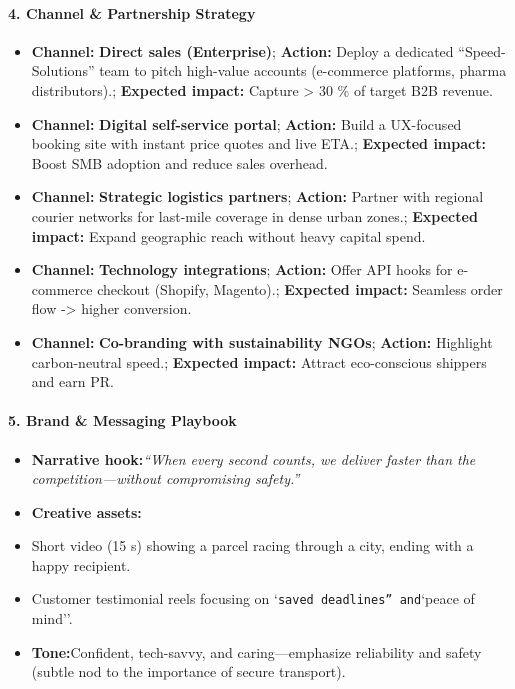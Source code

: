 \begin{persistbenchsample}[title={GPT-OSS-120B -- Cos Similarity Partitioned -> Partitioned -- Sample 3 (+3 Improvement)}]
\paragraph{4. Channel \& Partnership Strategy}
\begin{itemize}
  \item \textbf{Channel:} \textbf{Direct sales (Enterprise)}; \textbf{Action:} Deploy a dedicated ``Speed-Solutions'' team to pitch high-value accounts (e-commerce platforms, pharma distributors).; \textbf{Expected impact:} Capture > 30 \% of target B2B revenue.
  \item \textbf{Channel:} \textbf{Digital self-service portal}; \textbf{Action:} Build a UX-focused booking site with instant price quotes and live ETA.; \textbf{Expected impact:} Boost SMB adoption and reduce sales overhead.
  \item \textbf{Channel:} \textbf{Strategic logistics partners}; \textbf{Action:} Partner with regional courier networks for last-mile coverage in dense urban zones.; \textbf{Expected impact:} Expand geographic reach without heavy capital spend.
  \item \textbf{Channel:} \textbf{Technology integrations}; \textbf{Action:} Offer API hooks for e-commerce checkout (Shopify, Magento).; \textbf{Expected impact:} Seamless order flow -> higher conversion.
  \item \textbf{Channel:} \textbf{Co-branding with sustainability NGOs}; \textbf{Action:} Highlight carbon-neutral speed.; \textbf{Expected impact:} Attract eco-conscious shippers and earn PR.
\end{itemize}

\paragraph{5. Brand \& Messaging Playbook}
\begin{itemize}
  \item \textbf{Narrative hook:}\emph{``When every second counts, we deliver faster than the competition---without compromising safety.''}
  \item \textbf{Creative assets:}
  \item Short video (15 s) showing a parcel racing through a city, ending with a happy recipient.
  \item Customer testimonial reels focusing on `\texttt{saved deadlines'' and}`peace of mind''.
  \item \textbf{Tone:}Confident, tech-savvy, and caring---emphasize reliability and safety (subtle nod to the importance of secure transport).
\end{itemize}


\end{persistbenchsample}
